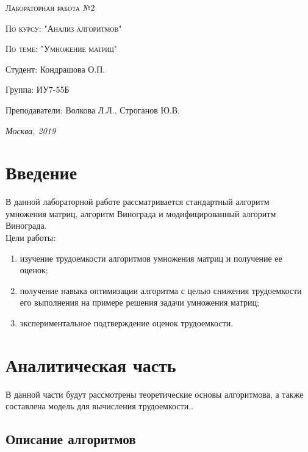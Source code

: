 \documentclass[a4paper, 14pt]{article}
\begin{document}
\begin{titlepage}
	\centering
	{\scshape\Large Лабораторная работа №2\par}
	{\scshape\Large По курсу: "Анализ алгоритмов"\par}
	{\scshape\Large По теме: "Умножение матриц"\par}
	\vspace{7cm}
	\Large Студент: Кондрашова О.П.\par
	\Large Группа: ИУ7-55Б\par
	\Large Преподаватели:  Волкова Л.Л., Строганов Ю.В.\par

	\vfill
	\large \textit {Москва, 2019} \par
	
\end{titlepage}

	\setcounter{page}{2}
	\tableofcontents
	
	\newpage
	\section*{Введение}
	
	
		 В данной лабораторной работе рассматривается стандартный алгоритм умножения матриц, алгоритм Винограда и модифицированный алгоритм Винограда. \\
		 
		 
	Цели работы:
\begin{enumerate}
	\item изучение трудоемкости алгоритмов умножения матриц и получение ее оценок;
	\item получение навыка оптимизации алгоритма с целью снижения трудоемкости его выполнения на примере решения задачи умножения матриц;
	\item экспериментальное подтверждение оценок трудоемкости.
\end{enumerate}

	
	\newpage
	\section{Аналитическая часть}
	
	В данной части будут рассмотрены теоретические основы алгоритмова, а также составлена модель для вычисления трудоемкости..
	
	\subsection{Описание алгоритмов}
	
\end{document}
